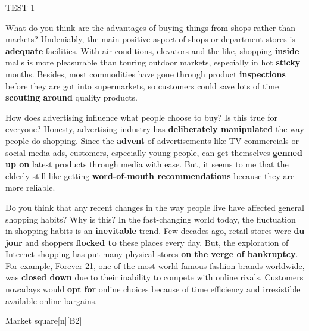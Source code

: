 \begin{glossarymc}[Cambridge 9]
\begin{test}{TEST 1}
    \begin{qa}{What do you think are the advantages of buying things from shops rather than markets?}
    Undeniably, the main positive aspect of shops or department stores is \textbf{adequate} facilities. With air-conditions, elevators and the like, shopping \textbf{inside} malls is more pleasurable than touring outdoor markets, especially in hot \textbf{sticky} months. Besides, most commodities have gone through product \textbf{inspections} before they are got into supermarkets, so customers could save lots of time \textbf{scouting around} quality products.
    \end{qa}

    \begin{qa}{How does advertising influence what people choose to buy? Is this true for everyone?}
    Honesty, advertising industry has \textbf{deliberately manipulated} the way people do shopping. Since the \textbf{advent} of advertisements like TV commercials or social media ads, customers, especially young people, can get themselves \textbf{genned up on} latest products through media with ease. But, it seems to me that the elderly still like getting \textbf{word-of-mouth recommendations} because they are more reliable.
    \end{qa}

    \begin{qa}{Do you think that any recent changes in the way people live have affected general shopping habits? Why is this?}
    In the fast-changing world today, the fluctuation in shopping habits is an \textbf{inevitable} trend. Few decades ago, retail stores were \textbf{du jour} and shoppers \textbf{flocked to} these places every day. But, the exploration of Internet shopping has put many physical stores \textbf{on the verge of bankruptcy}. For example, Forever 21, one of the most world-famous fashion brands worldwide, was \textbf{closed down} due to their inability to compete with online rivals. Customers nowadays would \textbf{opt for} online choices because of time efficiency and irresistible available online bargains.
    \end{qa}

        \begin{VocabExplain}[Part 3]
            \begin{ExplainCard}{Market square}[n][B2]
            \end{ExplainCard}


\end{VocabExplain}
\end{test}
\end{glossarymc}

